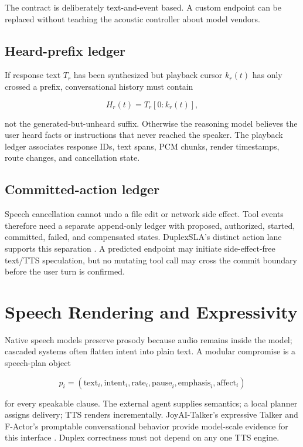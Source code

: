 \documentclass[11pt]{article}
\begin{document}
The contract is deliberately text-and-event based. A custom endpoint can be
replaced without teaching the acoustic controller about model vendors.

\subsection{Heard-prefix ledger}

If response text $T_r$ has been synthesized but playback cursor $k_r(t)$ has
only crossed a prefix, conversational history must contain

\begin{equation}
  H_r(t)=T_r[0:k_r(t)],
  \label{eq:heardprefix}
\end{equation}

not the generated-but-unheard suffix. Otherwise the reasoning model believes
the user heard facts or instructions that never reached the speaker. The
playback ledger associates response IDs, text spans, PCM chunks, render
timestamps, route changes, and cancellation state.

\subsection{Committed-action ledger}

Speech cancellation cannot undo a file edit or network side effect. Tool
events therefore need a separate append-only ledger with proposed, authorized,
started, committed, failed, and compensated states. DuplexSLA's distinct action
lane supports this separation \citep{zhang2026duplexsla}. A predicted endpoint
may initiate side-effect-free text/TTS speculation, but no mutating tool call
may cross the commit boundary before the user turn is confirmed.

\section{Speech Rendering and Expressivity}

Native speech models preserve prosody because audio remains inside the model;
cascaded systems often flatten intent into plain text. A modular compromise is
a speech-plan object

\begin{equation}
  p_i=(\text{text}_i,\text{intent}_i,\text{rate}_i,
       \text{pause}_i,\text{emphasis}_i,\text{affect}_i)
  \label{eq:speechplan}
\end{equation}

for every speakable clause. The external agent supplies semantics; a local
planner assigns delivery; TTS renders incrementally. JoyAI-Talker's expressive
Talker and F-Actor's promptable conversational behavior provide model-scale
evidence for this interface \citep{bai2026joytalker,zufle2026factor}. Duplex
correctness must not depend on any one TTS engine.
\end{document}
